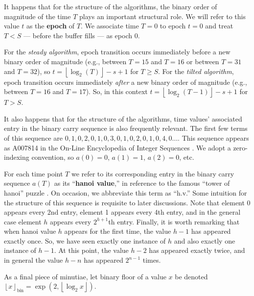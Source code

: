 It happens that for the structure of the algorithms, the binary order of magnitude of the time $T$ plays an important structural role.
We will refer to this value $t$ as the \textbf{epoch} of $T$.
We associate time $T=0$ to epoch $t=0$ and treat $T < S$ --- before the buffer fills --- as epoch 0.

For the \textit{steady algorithm}, epoch transition occurs immediately before a new binary order of magnitude (e.g., between $T = 15$ and $T = 16$ or between $T = 31$ and $T = 32$), so $t = \left\lfloor \log_2(T) \right\rfloor - s + 1$ for $T \geq S$.
For the \textit{tilted algorithm}, epoch transition occurs immediately \textit{after} a new binary order of magnitude (e.g., between $T = 16$ and $T = 17$).
So, in this context $t = \left\lfloor \log_2(T - 1) \right\rfloor - s + 1$ for $T > S$.

It also happens that for the structure of the algorithms, time values' associated entry in the binary carry sequence is also frequently relevant.
The first few terms of this sequence are $0, 1, 0, 2, 0, 1, 0, 3, 0, 1, 0, 2, 0, 1, 0, 4, 0 \ldots$.
This sequence appears as A007814 in the On-Line Encyclopedia of Integer Sequences \citep{oeis}.
We adopt a zero-indexing convention, so $a(0) = 0$, $a(1) = 1$, $a(2) = 0$, etc.

For each time point $T$ we refer to its corresponding entry in the binary carry sequence $a(T)$ as its ``\textbf{hanoi value},'' in reference to the famous ``tower of hanoi'' puzzle \citep{lucas1889jeux}.
On occasion, we abbreviate this term as ``h.v.''
Some intuition for the structure of this sequence is requisite to later discussions.
Note that element 0 appears every 2nd entry, element 1 appears every 4th entry, and in the general case element $h$ appears every $2^{h+1}$th entry.
Finally, it is worth remarking that when hanoi value $h$ appears for the first time, the value $h - 1$ has appeared exactly once.
So, we have seen exactly one instance of $h$ and also exactly one instance of $h - 1$.
At this point, the value $h - 2$ has appeared exactly twice, and in general the value $h - n$ has appeared $2^{n - 1}$ times.

As a final piece of minutiae, let binary floor of a value $x$ be denoted $\left\lfloor x \right\rfloor_\mathrm{bin} = \exp(2, \left\lfloor \log_2 x \right\rfloor)$.
